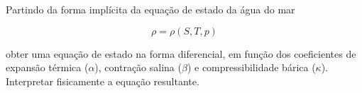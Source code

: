 \begin{questions}
  Partindo da forma implícita da equação de estado da água do mar

  \[
    \rho  =  \rho(S, T, p)
  \]

  obter uma equação de estado na forma diferencial, em função dos coeficientes
  de expansão térmica ($\alpha$), contração salina ($\beta$) e compressibilidade
  bárica ($\kappa$).  Interpretar fisicamente a equação resultante.
\end{questions}

\begin{questions}
\end{questions}
